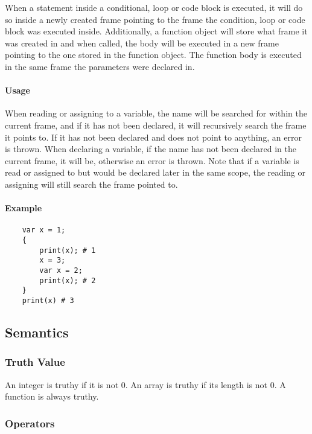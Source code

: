 When a statement inside a conditional, loop or code block is executed, it will do so inside a newly created frame pointing to the frame the condition, loop or code block was executed inside. Additionally, a function object will store what frame it was created in and when called, the body will be executed in a new frame pointing to the one stored in the function object. The function body is executed in the same frame the parameters were declared in.

\paragraph{Usage}

When reading or assigning to a variable, the name will be searched for within the current frame, and if it has not been declared, it will recursively search the frame it points to. If it has not been declared and does not point to anything, an error is thrown. When declaring a variable, if the name has not been declared in the current frame, it will be, otherwise an error is thrown. Note that if a variable is read or assigned to but would be declared later in the same scope, the reading or assigning will still search the frame pointed to.

\paragraph{Example}

\begin{verbatim}
    var x = 1;
    {
        print(x); # 1
        x = 3;
        var x = 2;
        print(x); # 2
    }
    print(x) # 3
\end{verbatim}

\subsection{Semantics}

\subsubsection{Truth Value}

An integer is truthy if it is not 0. An array is truthy if its length is not 0. A function is always truthy.

\subsubsection{Operators}

